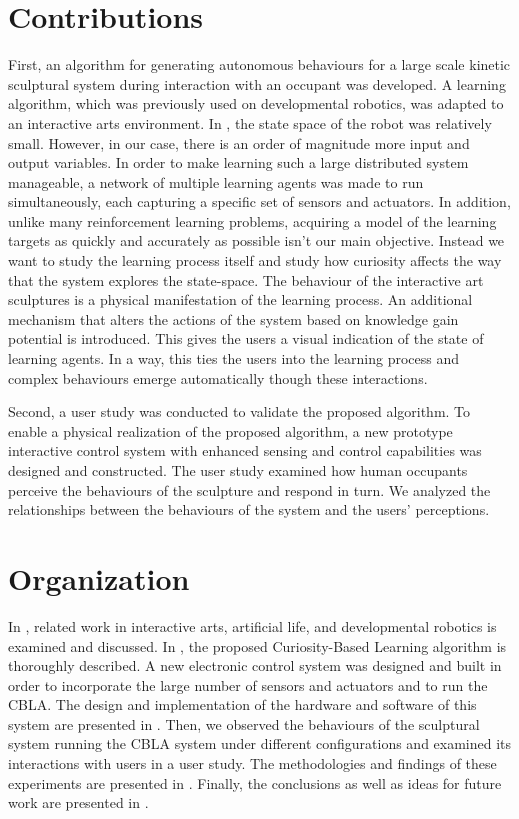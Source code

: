 \section{Contributions}

First, an algorithm for generating autonomous behaviours for a large scale kinetic sculptural system during interaction with an occupant was developed. A learning algorithm, which was previously used on developmental robotics, was adapted to an interactive arts environment. In \cite{Oudeyer2007}, the state space of the robot was relatively small. However, in our case, there is an order of magnitude more input and output variables. In order to make learning such a large distributed system manageable, a network of multiple learning agents was made to run simultaneously, each capturing a specific set of sensors and actuators. In addition, unlike many reinforcement learning problems, acquiring a model of the learning targets as quickly and accurately as possible isn't our main objective. Instead we want to study the learning process itself and study how curiosity affects the way that the system explores the state-space. The behaviour of the interactive art sculptures is a physical manifestation of the learning process. An additional mechanism that alters the actions of the system based on knowledge gain potential is introduced. This gives the users a visual indication of the state of learning agents. In a way, this ties the users into the learning process and complex behaviours emerge automatically though these interactions. 

Second, a user study was conducted to validate the proposed algorithm. To enable a physical realization of the proposed algorithm, a new prototype interactive control system with enhanced sensing and control capabilities was designed and constructed. The user study examined how human occupants perceive the behaviours of the sculpture and respond in turn. We analyzed the relationships between the behaviours of the system and the users' perceptions. 


\section{Organization}

In , related work in interactive arts, artificial life, and developmental robotics is examined and discussed. In , the proposed Curiosity-Based Learning algorithm is thoroughly described. A new electronic control system was designed and built in order to incorporate the large number of sensors and actuators and to run the CBLA. The design and implementation of the hardware and software of this system are presented in . Then, we observed the behaviours of the sculptural system running the CBLA system under different configurations and examined its interactions with users in a user study. The methodologies and findings of these experiments are presented in . Finally, the conclusions as well as ideas for future work are presented in .
